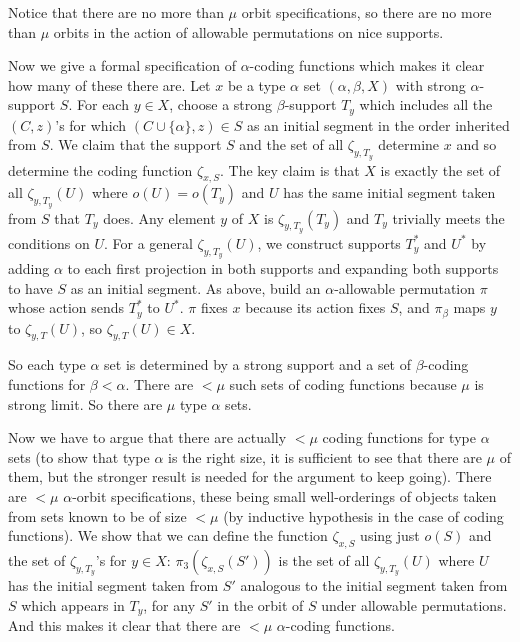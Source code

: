 \documentclass[12pt]{article}
\begin{document}
Notice that there are no more than $\mu$ orbit specifications, so there are no more than  $\mu$ orbits in the action of allowable permutations on nice supports.

Now we give a formal specification of $\alpha$-coding functions which makes it clear how many of these there are.  Let $x$ be a type $\alpha$ set $(\alpha,\beta,X)$ with strong $\alpha$-support $S$.  For each $y \in X$, choose a strong $\beta$-support $T_y$ which includes all the $(C,z)$'s for which $(C \cup \{\alpha\},z) \in S$ as an initial segment in the order inherited from $S$.  We claim that the support $S$
and the set of all $\zeta_{y,T_y}$ determine $x$ and so determine the coding function $\zeta_{x,S}$.  The key claim is that $X$ is exactly the set of all $\zeta_{y,T_y}(U)$ where $o(U) = o(T_y)$ and $U$ has the same initial segment taken from $S$ that $T_y$ does.  Any element $y$ of $X$
is $\zeta_{y,T_y}(T_y)$ and $T_y$ trivially meets the conditions on $U$.  For a general $\zeta_{y,T_y}(U)$, we construct supports $T_y^*$ and $U^*$ by adding $\alpha$ to each first projection in both supports and expanding both supports to have $S$ as an initial segment.  As above, build an $\alpha$-allowable permutation $\pi$ whose action sends
$T_y^*$ to $U^*$.  $\pi$ fixes $x$ because its action fixes $S$, and $\pi_\beta$ maps $y$ to $\zeta_{y,T}(U)$, so $\zeta_{y,T}(U)\in X$.   

So each type $\alpha$ set is determined by a strong support and a set of $\beta$-coding functions for $\beta<\alpha$.  There are $<\mu$ such sets of coding functions because $\mu$ is strong limit.  So there are $\mu$ type $\alpha$ sets.  

Now we have to argue that there are actually $<\mu$ coding functions for type $\alpha$ sets (to show that type $\alpha$ is the right size, it is sufficient to see that there are $\mu$ of them, but the stronger result is needed for the argument to keep going).  There are $<\mu$ $\alpha$-orbit specifications, these being small well-orderings of objects taken from sets known to be of size $<\mu$ (by inductive hypothesis in the case of coding functions).  We show that we can define the function $\zeta_{x,S}$ using just $o(S)$ and the set of $\zeta_{y,T_y}$'s for $y \in X$:  $\pi_3(\zeta_{x,S}(S'))$ is the set of all $\zeta_{y,T_y}(U)$ where $U$ has the initial segment taken from $S'$ analogous to the initial segment taken from $S$ which appears in $T_y$, for any $S'$ in the orbit of $S$ under allowable permutations.  And this makes it clear that there are $<\mu$ $\alpha$-coding functions.
\end{document}
